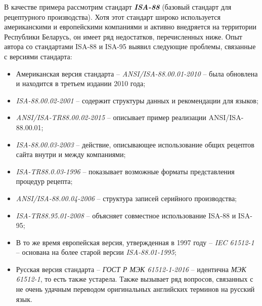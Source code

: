 В качестве примера рассмотрим стандарт \textbf{\textit{ISA-88}} \cite{ISA88} (базовый стандарт для рецептурного производства). Хотя этот стандарт широко используется американскими и европейскими компаниями и активно внедряется на территории Республики Беларусь, он имеет ряд недостатков, перечисленных ниже. Опыт автора со стандартами ISA-88 и ISA-95 выявил следующие проблемы, связанные с версиями стандарта:
\begin{itemize}
\item Американская версия стандарта -- \textit{ANSI/ISA-88.00.01-2010} -- была обновлена и находится в третьем издании 2010 года;
\item \textit{ISA-88.00.02-2001} – содержит структуры данных и рекомендации для языков;
\item \textit{ANSI/ISA-TR88.00.02-2015} -- описывает пример реализации ANSI/ISA-88.00.01;
\item \textit{ISA-88.00.03-2003} -- действие, описывающее использование общих рецептов сайта внутри и между компаниями;
\item \textit{ISA-TR88.0.03-1996} -- показывает возможные форматы представления процедур рецепта;
\item \textit{ANSI/ISA-88.00.04-2006} -- структура записей серийного производства;
\item \textit{ISA-TR88.95.01-2008} -- объясняет совместное использование ISA-88 и ISA-95;
\item В то же время европейская версия, утвержденная в 1997 году -- \textit{IEC 61512-1} -- основана на более старой версии \textit{ISA-88.01-1995};
\item Русская версия стандарта -- \textit{ГОСТ Р МЭК 61512-1-2016} -- идентична \textit{МЭК 61512-1}, то есть также устарела. Также вызывает ряд вопросов, связанных с не очень удачным переводом оригинальных английских терминов на русский язык.
\end{itemize}

